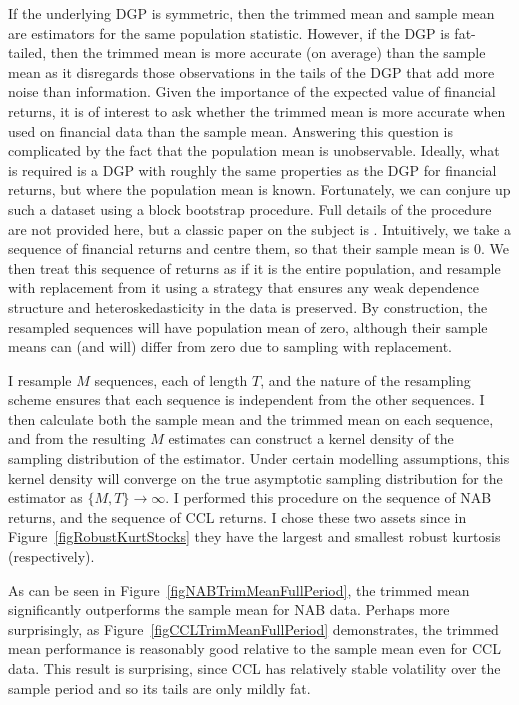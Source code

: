 \documentclass[12pt,a4paper]{amsart}
\newcommand{\can}{\citeasnoun}							%
\newcommand{\ra}{\rightarrow}							%
\begin{document}
If the underlying DGP is symmetric, then the trimmed mean and sample mean are estimators for the same population statistic. However, if the DGP is fat-tailed, then the trimmed mean is more accurate (on average) than the sample mean as it disregards those observations in the tails of the DGP that add more noise than information. Given the importance of the expected value of financial returns, it is of interest to ask whether the trimmed mean is more accurate when used on financial data than the sample mean. Answering this question is complicated by the fact that the population mean is unobservable. Ideally, what is required is a DGP with roughly the same properties as the DGP for financial returns, but where the population mean is known. Fortunately, we can conjure up such a dataset using a block bootstrap procedure. Full details of the procedure are not provided here, but a classic paper on the subject is \can{Politis_Romano_(1994)}. Intuitively, we take a sequence of financial returns and centre them, so that their sample mean is $0$. We then treat this sequence of returns as if it is the entire population, and resample with replacement from it using a strategy that ensures any weak dependence structure and heteroskedasticity in the data is preserved. By construction, the resampled sequences will have population mean of zero, although their sample means can (and will) differ from zero due to sampling with replacement.

I resample $M$ sequences, each of length $T$, and the nature of the resampling scheme ensures that each sequence is independent from the other sequences. I then calculate both the sample mean and the trimmed mean on each sequence, and from the resulting $M$ estimates can construct a kernel density of the sampling distribution of the estimator. Under certain modelling assumptions, this kernel density will converge on the true asymptotic sampling distribution for the estimator as $\{M, T\} \ra \infty$. I performed this procedure on the sequence of NAB returns, and the sequence of CCL returns. I chose these two assets since in Figure~\ref{figRobustKurtStocks} they have the largest and smallest robust kurtosis (respectively).

As can be seen in Figure~\ref{figNABTrimMeanFullPeriod}, the trimmed mean significantly outperforms the sample mean for NAB data. Perhaps more surprisingly, as Figure~\ref{figCCLTrimMeanFullPeriod} demonstrates, the trimmed mean performance is reasonably good relative to the sample mean even for CCL data. This result is surprising, since CCL has relatively stable volatility over the sample period and so its tails are only mildly fat.
\end{document}
